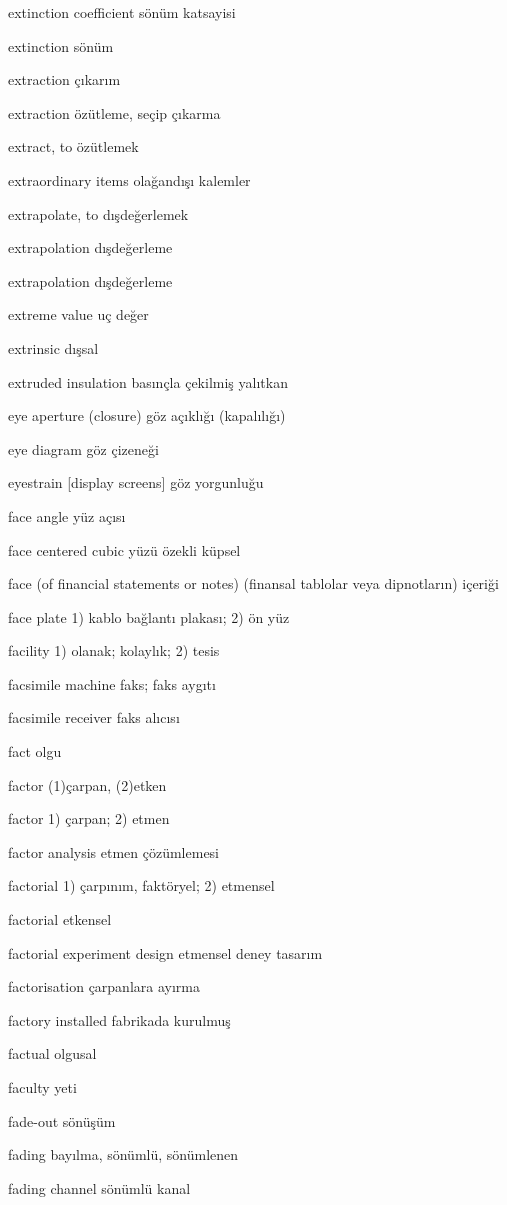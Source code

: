 \documentclass[12pt,fleqn]{article}\usepackage{../../common}
\begin{document}
extinction coefficient sönüm katsayisi

extinction sönüm

extraction çıkarım

extraction özütleme, seçip çıkarma

extract, to özütlemek

extraordinary items olağandışı kalemler

extrapolate, to dışdeğerlemek

extrapolation dışdeğerleme

extrapolation dışdeğerleme

extreme value uç değer

extrinsic dışsal

extruded insulation basınçla çekilmiş yalıtkan

eye aperture (closure) göz açıklığı (kapalılığı)

eye diagram göz çizeneği

eyestrain [display screens] göz yorgunluğu

face angle yüz açısı

face centered cubic yüzü özekli küpsel

face (of financial statements or notes) (finansal tablolar veya dipnotların) içeriği

face plate 1) kablo bağlantı plakası; 2) ön yüz

facility 1) olanak; kolaylık; 2) tesis

facsimile machine faks; faks aygıtı

facsimile receiver faks alıcısı

fact olgu

factor (1)çarpan, (2)etken

factor 1) çarpan; 2) etmen

factor analysis etmen çözümlemesi

factorial 1) çarpınım, faktöryel; 2) etmensel

factorial etkensel

factorial experiment design etmensel deney tasarım

factorisation çarpanlara ayırma

factory installed fabrikada kurulmuş

factual olgusal

faculty yeti

fade-out sönüşüm

fading bayılma, sönümlü, sönümlenen

fading channel sönümlü kanal
\end{document}

